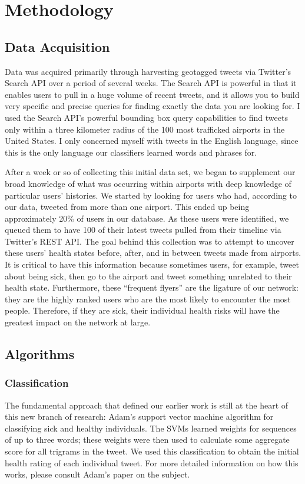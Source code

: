 \documentclass[11pt, letterpaper]{article}
\begin{document}
    \section{Methodology}
        \subsection{Data Acquisition}
            Data was acquired primarily through harvesting geotagged tweets via Twitter's Search API over a period of several weeks. The Search API is powerful in that it enables users to pull in a huge volume of recent tweets, and it allows you to build very specific and precise queries for finding exactly the data you are looking for. I used the Search API's powerful bounding box query capabilities to find tweets only within a three kilometer radius of the 100 most trafficked airports in the United States. I only concerned myself with tweets in the English language, since this is the only language our classifiers learned words and phrases for.

            After a week or so of collecting this initial data set, we began to supplement our broad knowledge of what was occurring within airports with deep knowledge of particular users' histories. We started by looking for users who had, according to our data, tweeted from more than one airport. This ended up being approximately 20\% of users in our database. As these users were identified, we queued them to have 100 of their latest tweets pulled from their timeline via Twitter's REST API. The goal behind this collection was to attempt to uncover these users' health states before, after, and in between tweets made from airports. It is critical to have this information because sometimes users, for example, tweet about being sick, then go to the airport and tweet something unrelated to their health state. Furthermore, these ``frequent flyers'' are the ligature of our network: they are the highly ranked users who are the most likely to encounter the most people. Therefore, if they are sick, their individual health risks will have the greatest impact on the network at large.

        \subsection{Algorithms}
            \subsubsection{Classification}
                The fundamental approach that defined our earlier work is still at the heart of this new branch of research: Adam's support vector machine algorithm for classifying sick and healthy individuals. The SVMs learned weights for sequences of up to three words; these weights were then used to calculate some aggregate score for all trigrams in the tweet. We used this classification to obtain the initial health rating of each individual tweet. For more detailed information on how this works, please consult Adam's paper on the subject. \cite{sadilek}
\end{document}
